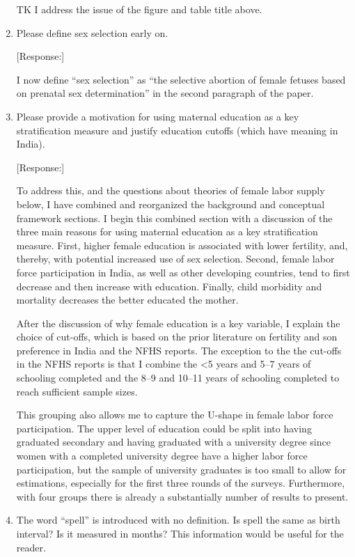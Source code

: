 \documentclass[letterpaper,12pt]{article}
\begin{document}
\begin{enumerate}
TK I address the issue of the figure and table title above.



\item Please define sex selection early on.

[Response:] 

I now define ``sex selection'' as ``the selective abortion of female fetuses 
based on prenatal sex determination'' in the second paragraph of the paper.


\item Please provide a motivation for using maternal education as a key
stratification measure and justify education cutoffs (which have meaning
in India).

[Response:] 

To address this, and the questions about theories of female labor supply below, I have
combined and reorganized the background and conceptual framework sections.
I begin this combined section with a discussion of the three main reasons for using 
maternal education as a key stratification measure.
First, higher female education is associated with lower fertility, and, thereby, with
potential increased use of sex selection.
Second, female labor force participation in India, as well as other developing countries, 
tend to first decrease and then increase with education.
Finally, child morbidity and mortality decreases the better educated the mother.

After the discussion of why female education is a key variable, I explain the choice
of cut-offs, which is based on the prior literature on fertility and son preference in 
India and the NFHS reports.
The exception to the the cut-offs in the NFHS reports is that I combine
the <5 years and 5--7 years of schooling completed and 
the 8--9 and 10--11 years of schooling completed to reach sufficient sample sizes.

This grouping also allows me to capture the U-shape in female labor force participation.
The upper level of education could be split into having graduated secondary and having 
graduated with a university degree since women with a completed university degree have 
a higher labor force participation, but the sample of university graduates is too small 
to allow for estimations, especially for the first three rounds of the surveys.
Furthermore, with four groups there is already a substantially number of results to 
present.


\item The word ``spell'' is introduced with no definition. Is spell the
same as birth interval? Is it measured in months? This information would
be useful for the reader.


\end{enumerate}
\end{document}
